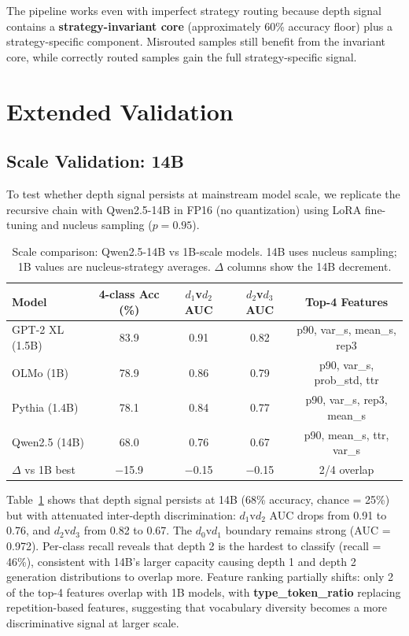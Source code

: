 \documentclass[11pt,a4paper]{article}
\begin{document}
The pipeline works even with imperfect strategy routing because depth signal contains a \textbf{strategy-invariant core} (approximately 60\% accuracy floor) plus a strategy-specific component. Misrouted samples still benefit from the invariant core, while correctly routed samples gain the full strategy-specific signal.

\section{Extended Validation}
\label{sec:extended}

\subsection{Scale Validation: 14B}

To test whether depth signal persists at mainstream model scale, we replicate the recursive chain with Qwen2.5-14B in FP16 (no quantization) using LoRA fine-tuning and nucleus sampling ($p{=}0.95$).

\begin{table}[t]
\centering
\caption{Scale comparison: Qwen2.5-14B vs 1B-scale models. 14B uses nucleus sampling; 1B values are nucleus-strategy averages. $\Delta$ columns show the 14B decrement.}
\label{tab:scale_comparison}
\small
\begin{tabular}{lcccc}
\toprule
\textbf{Model} & \textbf{4-class Acc (\%)} & \textbf{$d_1$v$d_2$ AUC} & \textbf{$d_2$v$d_3$ AUC} & \textbf{Top-4 Features} \\
\midrule
GPT-2 XL (1.5B) & 83.9 & 0.91 & 0.82 & p90, var\_s, mean\_s, rep3 \\
OLMo (1B)       & 78.9 & 0.86 & 0.79 & p90, var\_s, prob\_std, ttr \\
Pythia (1.4B)    & 78.1 & 0.84 & 0.77 & p90, var\_s, rep3, mean\_s \\
\midrule
Qwen2.5 (14B)   & 68.0 & 0.76 & 0.67 & p90, mean\_s, ttr, var\_s \\
$\Delta$ vs 1B best & $-$15.9 & $-$0.15 & $-$0.15 & 2/4 overlap \\
\bottomrule
\end{tabular}
\end{table}

Table~\ref{tab:scale_comparison} shows that depth signal persists at 14B (68\% accuracy, chance = 25\%) but with attenuated inter-depth discrimination: $d_1$v$d_2$ AUC drops from 0.91 to 0.76, and $d_2$v$d_3$ from 0.82 to 0.67. The $d_0$v$d_1$ boundary remains strong (AUC = 0.972). Per-class recall reveals that depth 2 is the hardest to classify (recall = 46\%), consistent with 14B's larger capacity causing depth 1 and depth 2 generation distributions to overlap more. Feature ranking partially shifts: only 2 of the top-4 features overlap with 1B models, with \textbf{type\_token\_ratio} replacing repetition-based features, suggesting that vocabulary diversity becomes a more discriminative signal at larger scale.
\end{document}
